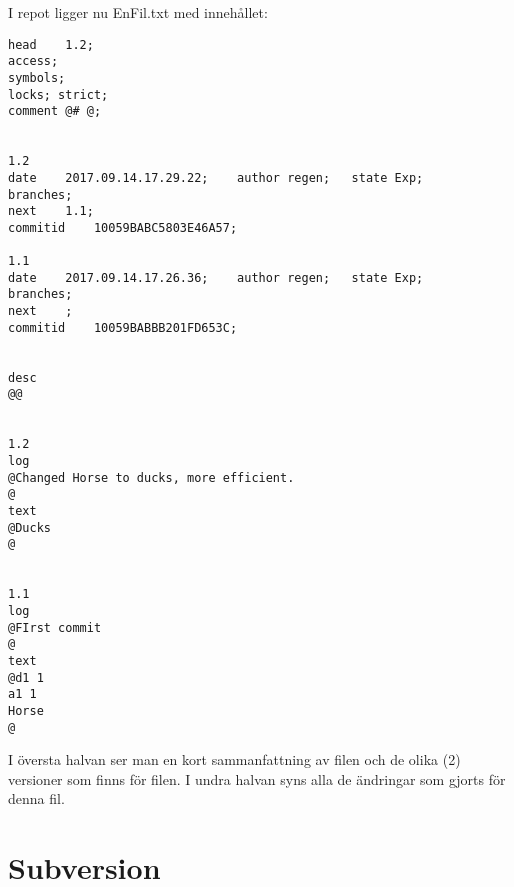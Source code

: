 \documentclass[11pt]{article}
\begin{document}
I repot ligger nu EnFil.txt med innehållet: 
\begin{verbatim}
head	1.2;
access;
symbols;
locks; strict;
comment	@# @;


1.2
date	2017.09.14.17.29.22;	author regen;	state Exp;
branches;
next	1.1;
commitid	10059BABC5803E46A57;

1.1
date	2017.09.14.17.26.36;	author regen;	state Exp;
branches;
next	;
commitid	10059BABBB201FD653C;


desc
@@


1.2
log
@Changed Horse to ducks, more efficient.
@
text
@Ducks
@


1.1
log
@FIrst commit
@
text
@d1 1
a1 1
Horse
@

\end{verbatim}

I översta halvan ser man en kort sammanfattning av filen och de olika (2) versioner som finns för filen. I undra halvan syns alla de ändringar som gjorts för denna fil. 

\section{Subversion}
\lipsum[3]
\end{document}
